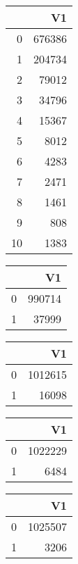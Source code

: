 \bigskip\bigskip
\centering
\begin{tabular}{rr}
  \hline
 & V1 \\ 
  \hline
0 & 676386 \\ 
  1 & 204734 \\ 
  2 & 79012 \\ 
  3 & 34796 \\ 
  4 & 15367 \\ 
  5 & 8012 \\ 
  6 & 4283 \\ 
  7 & 2471 \\ 
  8 & 1461 \\ 
  9 & 808 \\ 
  10 & 1383 \\ 
   \hline
\end{tabular}

\bigskip\bigskip
\centering
\begin{tabular}{rr}
  \hline
 & V1 \\ 
  \hline
0 & 990714 \\ 
  1 & 37999 \\ 
   \hline
\end{tabular}

\bigskip\bigskip
\centering
\begin{tabular}{rr}
  \hline
 & V1 \\ 
  \hline
0 & 1012615 \\ 
  1 & 16098 \\ 
   \hline
\end{tabular}

\bigskip\bigskip
\centering
\begin{tabular}{rr}
  \hline
 & V1 \\ 
  \hline
0 & 1022229 \\ 
  1 & 6484 \\ 
   \hline
\end{tabular}

\bigskip\bigskip
\centering
\begin{tabular}{rr}
  \hline
 & V1 \\ 
  \hline
0 & 1025507 \\ 
  1 & 3206 \\ 
   \hline
\end{tabular}


